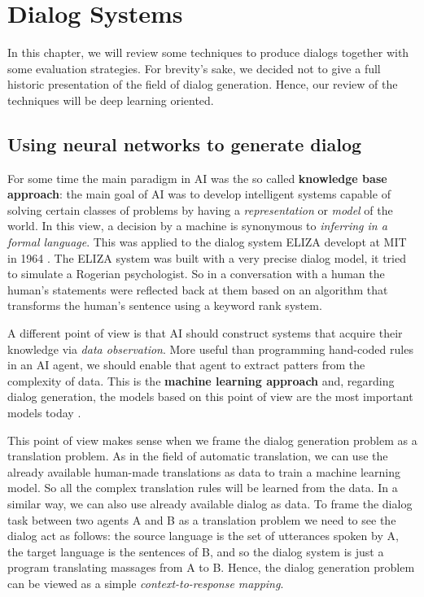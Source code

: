 \chapter{Dialog Systems}
\label{ch:03-dialog-systems}

 In this chapter, we will review some techniques to produce dialogs together with some evaluation strategies. For brevity's sake, we decided not to give a full historic presentation of the field of dialog generation. Hence, our review of the techniques will be deep learning oriented.

\section{Using neural networks to generate dialog}
\label{ch:03-gen}

\par For some time the main paradigm in AI was the so called \textbf{knowledge base approach}: the main goal of AI was to develop intelligent systems capable of solving certain classes of problems by having a \textit{representation} or \textit{model} of the world. In this view, a decision by a machine is synonymous to \textit{inferring in a formal language}\cite{McCarthy}. This was applied to the dialog system ELIZA developt at MIT in 1964 \cite{Weizenbaum}. The ELIZA system was built with a very precise dialog model, it tried to simulate a Rogerian psychologist. So in a conversation with a human the human's statements were reflected back at them based on an algorithm that transforms the human's sentence using a keyword rank system.

\par A different point of view is that AI should construct systems that acquire their knowledge via \textit{data observation}. More useful than programming hand-coded rules in an AI agent, we should enable that agent to extract patters from the complexity of data. This is the \textbf{machine learning approach} and, regarding dialog generation, the models based on this point of view are the most important models today \cite{BordesW16, Lowe:2016, Serban:2016c, Serban:2016a, Shao:2017, Wen}.

This point of view makes sense when we frame the dialog generation problem as a translation problem. As in the field of automatic translation, we can use the already available human-made translations as data to train a machine learning model. So all the complex translation rules will be learned from the data. In a similar way, we can also use already available dialog as data. To frame the dialog task between two agents A and B as a translation problem we need to see the dialog act as follows: the source language is the set of utterances spoken by A, the target language is the sentences of B, and so the dialog system is just a program translating massages from A to B. Hence, the dialog generation problem can be viewed as a simple \textit{context-to-response mapping}.

